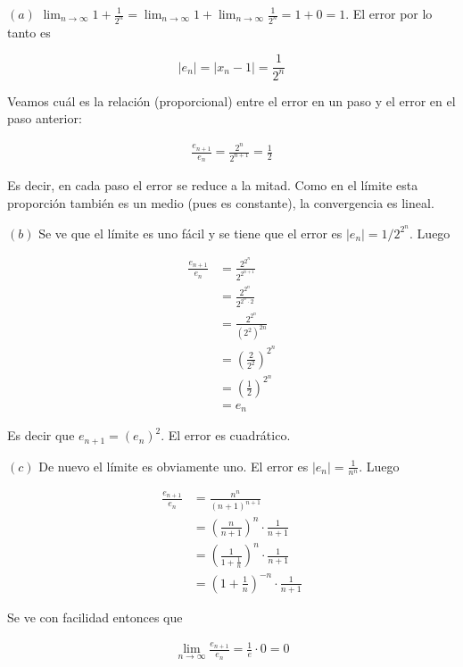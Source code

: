 \documentclass[12pt]{article}
\begin{document}
$(a)$ $\lim_{n \to \infty} 1 + \frac{1}{2^n} = \lim_{n \to \infty} 1 + \lim_{n
\to \infty} \frac{1}{2^n} = 1 + 0 = 1$. El error por lo tanto es 

\begin{equation*}
    \left| e_n \right| = \left| x_n - 1 \right| = \frac{1}{2^n}
\end{equation*}

Veamos cuál es la relación (proporcional) entre el error en un paso y el error
en el paso anterior: 

\begin{align*}
    \frac{e_{n+1}}{e_n} = \frac{2^n}{2^{n+1}} = \frac{1}{2}
\end{align*}

Es decir, en cada paso el error se reduce a la mitad. Como en el límite esta
proporción también es un medio (pues es constante), la convergencia es lineal. 

$(b)$ Se ve que el límite es uno fácil y se tiene que el error es $\left| e_n
\right| = 1 / 2^{2^n}$. Luego 

\begin{align*}
    \frac{e_{n+1}}{e_n} 
    &= \frac{2^{2^n}}{2^{2^{n+1}}}  \\ 
    &= \frac{2^{2^n}}{2^{2^{n} \cdot 2}}  \\ 
    &= \frac{2^{2^n}}{(2^2)^{2n}}  \\ 
    &= \left( \frac{2}{2^2} \right)^{2^n}\\ 
    &=\left( \frac{1}{2} \right)^{2^n} \\ 
    &= e_n
\end{align*}

Es decir que $e_{n+1} = ( e_n )^2$. El error es cuadrático.

$(c)$ De nuevo el límite es obviamente uno. El error es $\left| e_n \right| =
\frac{1}{n^n}$. Luego 

\begin{align*}
    \frac{e_{n+1}}{e_n} 
    &= \frac{n^n}{(n+1)^{n+1}} \\
    &= \left( \frac{n}{n+1}
    \right)^n \cdot \frac{1}{n+1} \\ 
    &= \left( \frac{1}{1 + \frac{1}{n}} \right)^n
    \cdot \frac{1}{n+1}\\ 
    &= \left( 1 + \frac{1}{n} \right)^{-n} \cdot \frac{1}{n+1}
\end{align*}

Se ve con facilidad entonces que

\begin{align*}
    \lim_{n \to \infty} \frac{e_{n+1}}{e_n} = \frac{1}{e} \cdot 0 = 0
\end{align*}
\end{document}
